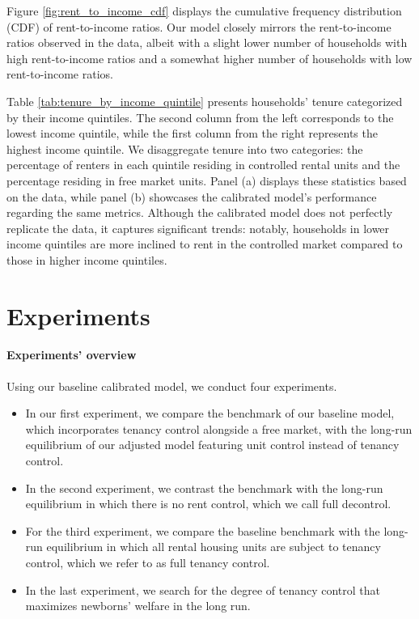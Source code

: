 \documentclass[parskip=full]{article}
\begin{document}
Figure \ref{fig:rent_to_income_cdf} displays the cumulative frequency distribution (CDF) of rent-to-income ratios. Our model closely mirrors the rent-to-income ratios observed in the data, albeit with a slight lower number of households with high rent-to-income ratios and a somewhat higher number of households with low rent-to-income ratios.

Table \ref{tab:tenure_by_income_quintile} presents households' tenure categorized by their income quintiles. The second column from the left corresponds to the lowest income quintile, while the first column from the right represents the highest income quintile. We disaggregate tenure into two categories: the percentage of renters in each quintile residing in controlled rental units and the percentage residing in free market units. Panel (a) displays these statistics based on the data, while panel (b) showcases the calibrated model's performance regarding the same metrics. Although the calibrated model does not perfectly replicate the data, it captures significant trends: notably, households in lower income quintiles are more inclined to rent in the controlled market compared to those in higher income quintiles.

\section{Experiments}\label{section:experiments}

\paragraph{Experiments' overview} Using our baseline calibrated model, we conduct four experiments.

\begin{itemize}
    \item In our first experiment, we compare the benchmark of our baseline model, which incorporates tenancy control alongside a free market, with the long-run equilibrium of our adjusted model featuring unit control instead of tenancy control.
    \item In the second experiment, we contrast the benchmark with the long-run equilibrium in which there is no rent control, which we call full decontrol.
    \item For the third experiment, we compare the baseline benchmark with the long-run equilibrium in which all rental housing units are subject to tenancy control, which we refer to as full tenancy control.
    \item In the last experiment, we search for the degree of tenancy control that maximizes newborns' welfare in the long run.
\end{itemize}
\end{document}
